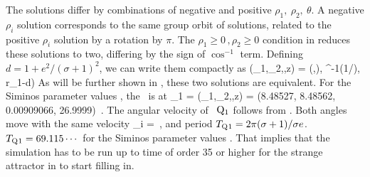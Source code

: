 {The solutions differ by combinations of negative and positive
$\rho_1,\ \rho_2,\ \theta$. A negative $\rho_i$ solution
corresponds to the same group orbit of solutions, related to
the positive $\rho_i$ solution by a rotation by $\pi$. The
$\rho_1 \geq 0 \,,\rho_2 \geq 0$ condition in
 reduces these solutions to two,
differing by the sign of $\cos ^{-1}$ term. Defining $d=1 +
{e^2}/{(\sigma +1)^2}$, we can write them compactly
as
\beq
(\rho_1,\rho_2,\theta,z) =
\left(,),
      \pm \cos^{-1}\left({1}/{}\right),
      r_1-d\right)
\label{eq:E1-PC}
\eeq
As will be further shown in ,
these two solutions are equivalent.
For the Siminos parameter
values , the \reqv\ is at
\beq
\ssp_{\REQB{}1} = (\rho_1,\rho_2,\theta,z) =
     (8.48527,
      8.48562,
      0.00909066,
      26.9999)
\,.
\label{eq:Q1}
\eeq
The angular velocity of \reqv\ $\mathrm{Q}_{1}$ follows from
. Both angles move with the same
velocity
\beq
\dot{\theta}_{i}
= 
\,,
\label{eq:REQB1veloc}
\eeq
and period ${T_{{\mathrm{Q}_{}1}}}= 2\pi (\sigma +
1)/\sigma e$. ${T_{{\mathrm{Q}_{}1}}}= 69.115\cdots$ for the
Siminos parameter values . That implies that
the simulation has to be run up to time of order 35 or higher for
the strange attractor in  to start filling in.
} %


